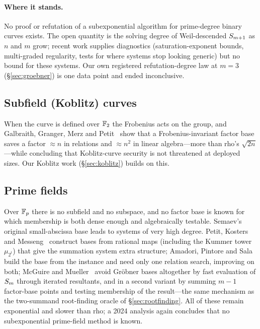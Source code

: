 \paragraph{Where it stands.} No proof or refutation of a subexponential
algorithm for prime-degree binary curves exists. The open quantity is the
solving degree of Weil-descended $S_{m+1}$ as $n$ and $m$ grow; recent
work supplies diagnostics (saturation-exponent bounds, multi-graded
regularity, tests for where systems stop looking generic) but no bound for
these systems. Our own registered refutation-degree law at $m=3$
(\S\ref{sec:groebner}) is one data point and ended inconclusive.

\subsection{Subfield (Koblitz) curves}

When the curve is defined over $\mathbb{F}_2$ the Frobenius acts on the group,
and Galbraith, Granger, Merz and Petit~\cite{ggmp2020} show that a
Frobenius-invariant factor base saves a factor $\approx n$ in relations and
$\approx n^2$ in linear algebra---more than rho's $\sqrt{2n}$---while
concluding that Koblitz-curve security is not threatened at deployed sizes.
Our Koblitz work (\S\ref{sec:koblitz}) builds on this.

\subsection{Prime fields}

Over $\mathbb{F}_p$ there is no subfield and no subspace, and no factor base is
known for which membership is both dense enough and algebraically testable.
Semaev's original small-abscissa base leads to systems of very high degree.
Petit, Kosters and Messeng~\cite{pkm2016} construct bases from rational maps
(including the Kummer tower $\mu_{2^t}$) that give the summation system
extra structure; Amadori, Pintore and Sala~\cite{aps2018} build the base
from the instance and need only one relation search, improving on both;
McGuire and Mueller~\cite{mcguire2017} avoid Gr\"obner bases altogether by
fast evaluation of $S_{m}$ through iterated resultants, and in a second
variant by summing $m-1$ factor-base points and testing membership of the
result---the same mechanism as the two-summand root-finding oracle of
\S\ref{sec:rootfinding}. All of these remain exponential and slower than
rho; a 2024 analysis again concludes that no subexponential prime-field
method is known.

